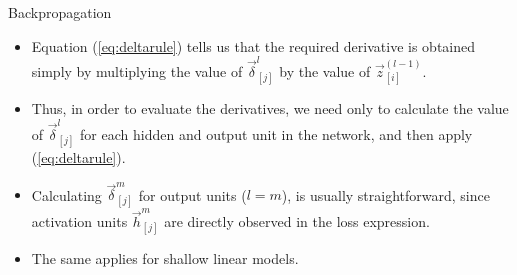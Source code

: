 \documentclass[handout]{beamer}
\begin{document}
\begin{frame}{Backpropagation}
\begin{scriptsize}

\begin{itemize}
 \item  Equation (\ref{eq:deltarule}) tells us that the required derivative is obtained simply by multiplying the value of $\vec{\delta}_{[j]}^l$ by the value of $\vec{z}_{[i]}^{(l-1)}$.
 
 \item Thus, in order to evaluate the derivatives, we need only to calculate the value of $\vec{\delta}_{[j]}^l$ for each hidden and output unit in the network, and then apply (\ref{eq:deltarule}).
 
 \item Calculating $\vec{\delta}_{[j]}^m$ for output units ($l=m$), is usually straightforward, since activation units $\vec{h}_{[j]}^m$ are directly observed in the loss expression.
 
 \item The same applies for shallow linear models.
\end{itemize} 
\end{scriptsize}
\end{frame}
\end{document}
